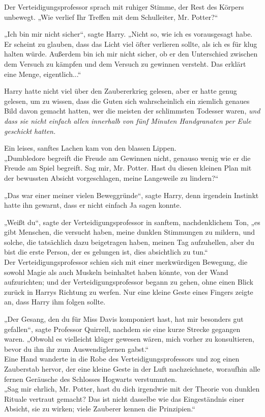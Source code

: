 {Der Verteidigungsprofessor sprach mit ruhiger Stimme, der Rest des Körpers unbewegt. „Wie verlief Ihr Treffen mit dem Schulleiter, Mr. Potter?“

„Ich bin mir nicht sicher“, sagte Harry. „Nicht so, wie ich es vorausgesagt habe. Er scheint zu glauben, dass das Licht viel öfter verlieren sollte, als ich es für klug halten würde. Außerdem bin ich mir nicht sicher, ob er den Unterschied zwischen dem Versuch zu kämpfen und dem Versuch zu gewinnen versteht. Das erklärt eine Menge, eigentlich...“

Harry hatte nicht viel über den Zaubererkrieg gelesen, aber er hatte genug gelesen, um zu wissen, dass die Guten sich wahrscheinlich ein ziemlich genaues Bild davon gemacht hatten, wer die meisten der schlimmsten Todesser waren, \emph{und dass sie nicht einfach allen innerhalb von fünf Minuten Handgranaten per Eule geschickt hatten.}

Ein leises, sanftes Lachen kam von den blassen Lippen.\\ „Dumbledore begreift die Freude am Gewinnen nicht, genauso wenig wie er die Freude am Spiel begreift. Sag mir, Mr. Potter. Hast du diesen kleinen Plan mit der bewussten Absicht vorgeschlagen, meine Langeweile zu lindern?“

„Das war einer meiner vielen Beweggründe“, sagte Harry, denn irgendein Instinkt hatte ihn gewarnt, dass er nicht einfach Ja sagen konnte.

„Weißt du“, sagte der Verteidigungsprofessor in sanftem, nachdenklichem Ton, „es gibt Menschen, die versucht haben, meine dunklen Stimmungen zu mildern, und solche, die tatsächlich dazu beigetragen haben, meinen Tag aufzuhellen, aber du bist die erste Person, der es gelungen ist, dies absichtlich zu tun.“\\ Der Verteidigungsprofessor schien sich mit einer merkwürdigen Bewegung, die sowohl Magie als auch Muskeln beinhaltet haben könnte, von der Wand aufzurichten; und der Verteidigungsprofessor begann zu gehen, ohne einen Blick zurück in Harrys Richtung zu werfen. Nur eine kleine Geste eines Fingers zeigte an, dass Harry ihm folgen sollte.

„Der Gesang, den du für Miss Davis komponiert hast, hat mir besonders gut gefallen“, sagte Professor Quirrell, nachdem sie eine kurze Strecke gegangen waren. „Obwohl es vielleicht klüger gewesen wären, mich vorher zu konsultieren, bevor du ihn ihr zum Auswendiglernen gabst.“\\ Eine Hand wanderte in die Robe des Verteidigungsprofessors und zog einen Zauberstab hervor, der eine kleine Geste in der Luft nachzeichnete, woraufhin alle fernen Geräusche des Schlosses Hogwarts verstummten.\\ „Sag mir ehrlich, Mr. Potter, hast du dich irgendwie mit der Theorie von dunklen Rituale vertraut gemacht? Das ist nicht dasselbe wie das Eingeständnis einer Absicht, sie zu wirken; viele Zauberer kennen die Prinzipien.“

}

